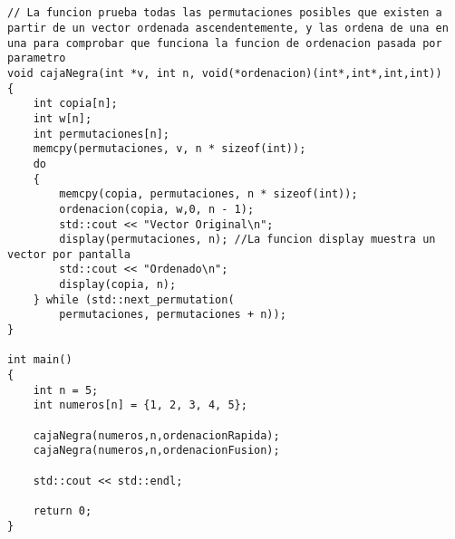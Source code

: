 \begin{lstlisting}


// La funcion prueba todas las permutaciones posibles que existen a partir de un vector ordenada ascendentemente, y las ordena de una en una para comprobar que funciona la funcion de ordenacion pasada por parametro
void cajaNegra(int *v, int n, void(*ordenacion)(int*,int*,int,int))
{
    int copia[n];
    int w[n];
    int permutaciones[n];
    memcpy(permutaciones, v, n * sizeof(int));
    do
    {
        memcpy(copia, permutaciones, n * sizeof(int));
        ordenacion(copia, w,0, n - 1);
        std::cout << "Vector Original\n";
        display(permutaciones, n); //La funcion display muestra un vector por pantalla
        std::cout << "Ordenado\n";
        display(copia, n);
    } while (std::next_permutation(
        permutaciones, permutaciones + n));
}

int main()
{
    int n = 5;
    int numeros[n] = {1, 2, 3, 4, 5};

    cajaNegra(numeros,n,ordenacionRapida);    
    cajaNegra(numeros,n,ordenacionFusion);    

    std::cout << std::endl;

    return 0;
}
\end{lstlisting}
